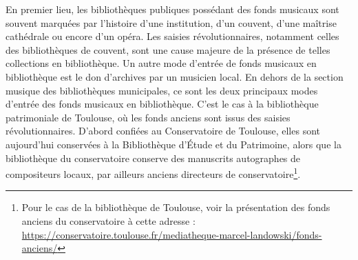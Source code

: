 En premier lieu, les bibliothèques publiques possédant des fonds musicaux sont souvent marquées par l’histoire d’une institution, d'un couvent, d'une maîtrise cathédrale ou encore d'un opéra. Les saisies révolutionnaires, notamment celles des bibliothèques de couvent, sont une cause majeure de la présence de telles collections en bibliothèque. Un autre mode d'entrée de fonds musicaux en bibliothèque est le don d’archives par un musicien local. En dehors de la section musique des bibliothèques municipales, ce sont les deux principaux modes d’entrée des fonds musicaux en bibliothèque. 
C’est le cas à la bibliothèque patrimoniale de Toulouse, où les fonds anciens sont issus des saisies révolutionnaires. D’abord confiées au Conservatoire de Toulouse, elles sont aujourd’hui conservées à la Bibliothèque d’Étude et du Patrimoine, alors que la bibliothèque du conservatoire conserve des manuscrits autographes de compositeurs locaux, par ailleurs anciens directeurs de conservatoire\footnote{Pour le cas de la bibliothèque de Toulouse, voir la présentation des fonds anciens du conservatoire à cette adresse : \url{https://conservatoire.toulouse.fr/mediatheque-marcel-landowski/fonds-anciens/}}. 

